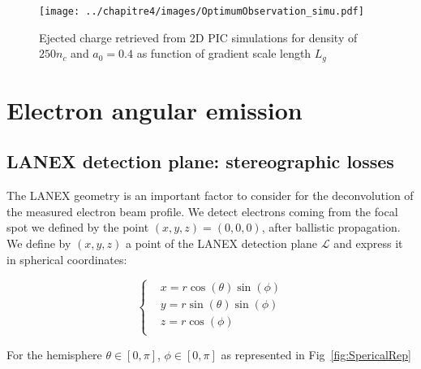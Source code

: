 \begin{figure}[H]
\begin{center}
\texttt{[image: ../chapitre4/images/OptimumObservation\_simu.pdf]}
\caption{\label{fig:OptimumObservation_simu}
Ejected charge retrieved from 2D PIC simulations for  density of $250n_c$ and $a_0 = 0.4$ as function of gradient scale length $L_g$}
\end{center}
\end{figure}

%

\section{Electron angular emission}

\subsection{LANEX detection plane: stereographic losses}

The LANEX geometry is an important factor to consider for the deconvolution of the measured electron beam profile. We detect electrons coming from the focal spot we defined by the point $(x,y,z) = (0,0,0)$, after ballistic propagation. We define by $(x,y,z)$ a point of the LANEX detection plane $\mathcal{L}$ and express it in spherical coordinates:

\begin{equation}
\label{eq:SphericalCoord}
  \left\{
      \begin{aligned}
      & x = r\cos(\theta)\sin(\phi)\\
      & y = r\sin(\theta)\sin(\phi)\\
      & z = r\cos(\phi)\\
      \end{aligned}
    \right.
\end{equation}

\noindent For the hemisphere $\theta \in \left[ 0,\pi \right]$, $\phi \in \left[ 0,\pi \right]$ as represented in Fig~\ref{fig:SpericalRep}\\


